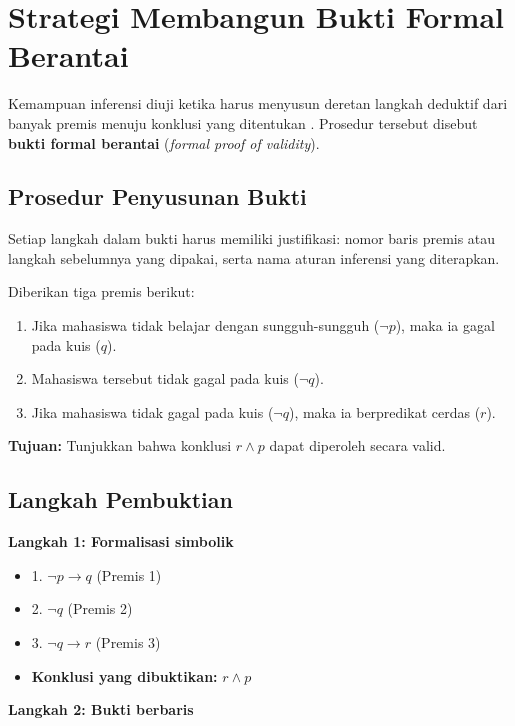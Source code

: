 \section{Strategi Membangun Bukti Formal Berantai}

Kemampuan inferensi diuji ketika harus menyusun deretan langkah deduktif dari banyak premis menuju konklusi yang ditentukan \cite{rosen2019}. Prosedur tersebut disebut \textbf{bukti formal berantai} (\textit{formal proof of validity}).

\subsection{Prosedur Penyusunan Bukti}

Setiap langkah dalam bukti harus memiliki justifikasi: nomor baris premis atau langkah sebelumnya yang dipakai, serta nama aturan inferensi yang diterapkan.

\begin{contoh}
Diberikan tiga premis berikut:
\begin{enumerate}
    \item Jika mahasiswa tidak belajar dengan sungguh-sungguh ($\neg p$), maka ia gagal pada kuis ($q$).
    \item Mahasiswa tersebut tidak gagal pada kuis ($\neg q$).
    \item Jika mahasiswa tidak gagal pada kuis ($\neg q$), maka ia berpredikat cerdas ($r$).
\end{enumerate}
\textbf{Tujuan:} Tunjukkan bahwa konklusi $r \land p$ dapat diperoleh secara valid.
\end{contoh}

\subsection{Langkah Pembuktian}

\textbf{Langkah 1: Formalisasi simbolik}
\begin{itemize}
    \item 1. $\neg p \rightarrow q$ \quad (Premis 1)
    \item 2. $\neg q$ \quad (Premis 2)
    \item 3. $\neg q \rightarrow r$ \quad (Premis 3)
    \item \textbf{Konklusi yang dibuktikan:} $r \land p$
\end{itemize}

\textbf{Langkah 2: Bukti berbaris}

